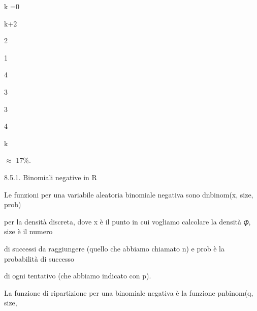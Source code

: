 \documentclass[a4paper,portrait,12pt]{article}
\begin{document}
\begin{flushleft}
k =0
\end{flushleft}





\begin{flushleft}
k+2
\end{flushleft}


2





1


4





3





3


4





\begin{flushleft}
k
\end{flushleft}





$\approx$ 17\%.





\begin{flushleft}
8.5.1. Binomiali negative in R
\end{flushleft}


\begin{flushleft}
Le funzioni per una variabile aleatoria binomiale negativa sono dnbinom(x, size, prob)
\end{flushleft}


\begin{flushleft}
per la densit\`{a} discreta, dove x \`{e} il punto in cui vogliamo calcolare la densit\`{a} 𝜑, size \`{e} il numero
\end{flushleft}


\begin{flushleft}
di successi da raggiungere (quello che abbiamo chiamato n) e prob \`{e} la probabilit\`{a} di successo
\end{flushleft}


\begin{flushleft}
di ogni tentativo (che abbiamo indicato con p).
\end{flushleft}


\begin{flushleft}
La funzione di ripartizione per una binomiale negativa \`{e} la funzione pnbinom(q, size,
\end{flushleft}
\end{document}
